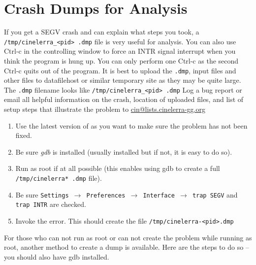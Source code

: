 \section{Crash Dumps for Analysis}%
\label{cha:crash_dumps_analysis}
If you get a SEGV crash and can explain what steps you took, a \texttt{/tmp/cinelerra\_<pid> .dmp} file is
very useful for analysis. You can also use Ctrl-c in the controlling window to force an INTR signal interrupt when
you think the program is hung up. You can only perform one Ctrl-c as the second Ctrl-c quits out of the program. It
is best to upload the \texttt{.dmp}, input files and other files to datafilehost or similar temporary site as they may be quite large. The \texttt{.dmp} filename looks like \texttt{/tmp/cinelerra\_<pid> .dmp} Log a bug report or email all
helpful information on the crash, location of uploaded files, and list of setup steps that illustrate the problem to
{\small \href{mailto:cin@lists.cinelerra-gg.org}{cin@lists.cinelerra-gg.org}}

\begin{enumerate}[nosep]
	\item Use the latest version of \CGG{} as you want to make sure the problem has not been fixed.
	\item Be sure \textit{gdb} is installed (usually installed but if not, it is easy to do so).
    \item Run as root if at all possible (this enables using gdb to create a full \texttt{/tmp/cinelerra* .dmp} file).
    \item Be sure \texttt{Settings $\rightarrow$ Preferences $\rightarrow$ Interface $\rightarrow$ trap SEGV} and \texttt{trap INTR} are checked.
	\item Invoke the error. This should create the file \texttt{/tmp/cinelerra-<pid>.dmp}
\end{enumerate}
\medskip

For those who can not run as root or can not create the problem while running as root, another method to create a dump
is available. Here are the steps to do so -- you should also have gdb installed.
\medskip

